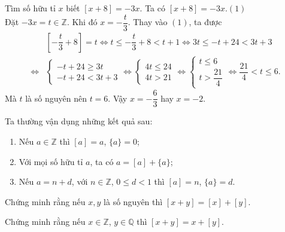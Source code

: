 \begin{vd}
	Tìm số hữu tỉ $x$ biết $\left[ x + 8 \right] =  - 3x$.
	\loigiai
	{Ta có $\left[ x + 8 \right] =  - 3x$.\hfill$(1)$\\
Đặt $-3x=t\in \mathbb{Z}$. Khi đó $x=-\dfrac{t}{3}$. Thay vào $(1)$, ta được
{\allowdisplaybreaks
\begin{align*}
&\left[  - \dfrac{t}{3} + 8 \right] = t \Leftrightarrow t \le  - \dfrac{t}{3} + 8 < t + 1 \Leftrightarrow 3t \le  - t + 24 < 3t + 3\\
\Leftrightarrow& \left\{ \begin{array}{l}
- t + 24 \ge 3t\\
- t + 24 < 3t + 3
\end{array} \right. \Leftrightarrow \left\{ \begin{array}{l}
4t \le 24\\
4t > 21
\end{array} \right. \Leftrightarrow \left\{ \begin{array}{l}
t \le 6\\
t > \dfrac{21}{4}
\end{array} \right. \Leftrightarrow \dfrac{21}{4} < t \le 6.
\end{align*}}Mà $t$ là số nguyên nên $t=6$. Vậy $x =  - \dfrac{6}{3}$ hay $x=-2$.
	}
\end{vd}
\begin{dang}
Ta thường vận dụng những kết quả sau:
	\begin{enumerate}[\tickEX]
		\item Nếu $a\in\mathbb{Z}$ thì $[a]=a$, $\{a\}=0$;
		\item Với mọi số hữu tỉ $a$, ta có $a=[a]+\{a\}$;
		\item Nếu $a=n+d$, với $n\in\mathbb{Z}$, $0\le d<1$ thì $[a]=n$, $\{a\}=d$.
	\end{enumerate}
\end{dang}
\begin{vd}
	Chứng minh rằng nếu $x, y$ là số nguyên thì 
	$\left[ x + y \right] = \left[ x \right] + \left[ y \right]$.
\end{vd}
\begin{vd}
	Chứng minh rằng nếu $x\in\mathbb{Z}$, $y\in\mathbb{Q} $ thì  
	$\left[ x + y \right] = x + \left[ y \right]$.
\end{vd}
